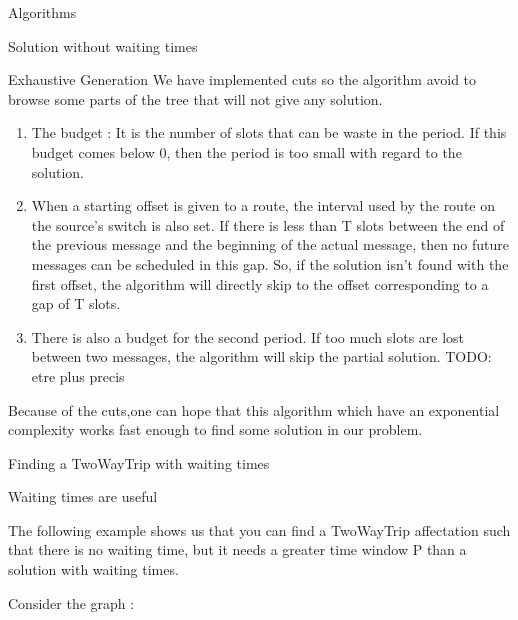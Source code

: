 \documentclass[a4paper,10pt]{report}
\newcommand{\todo}[1]{}
\renewcommand{\todo}[1]{{\color{red} TODO: {#1}}}
\begin{document}
\begin{chapter}{Algorithms}
\begin{section}{Solution without waiting times}
\begin{subsection}{Exhaustive Generation}
We have implemented cuts so the algorithm avoid to browse some parts of the tree that will not give any solution.
\begin{enumerate}
 \item The budget : It is the number of slots that can be waste in the period. If this budget comes below 0, then the period is too small with regard to
 the solution.
 \item When a starting offset is given to a route, the interval used by the route on the source's switch is also set. If there is less than T slots
 between the end of the previous message and the beginning of the actual message, then no future messages can be scheduled in this gap.
 So, if the solution isn't found with the first offset, the algorithm will directly skip to the offset corresponding to a gap of T slots.
 \item There is also a budget for the second period. If too much slots are lost between two messages, the algorithm will skip the partial solution.\todo{etre plus precis}
\end{enumerate}

Because of the cuts,one can hope that this algorithm which have an exponential complexity works fast enough to find some solution in our problem.

\end{subsection}

 \end{section}

\begin{section}{Finding a TwoWayTrip with waiting times}
\begin{subsection}{Waiting times are useful}
 
The following example shows us that you can find a TwoWayTrip affectation such that there is no waiting time, but it needs a greater time window P than a
solution with waiting times.

Consider the graph : 
\begin{center}
 
\end{center}
\end{subsection}
\end{section}
\end{chapter}
\end{document}

